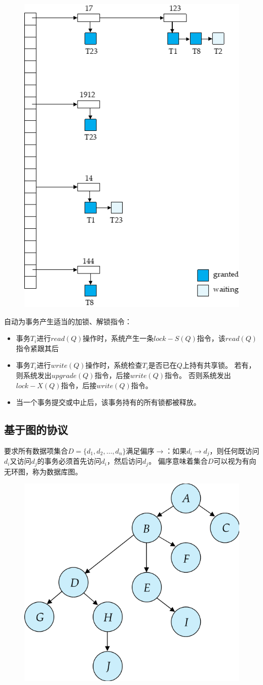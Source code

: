 \begin{figure}[H]
\centering
\includegraphics[width=0.4\linewidth]{fig/lock_table.png}
\end{figure}

自动为事务产生适当的加锁、解锁指令：
\begin{itemize}
	\item 事务$T_i$进行$read(Q)$操作时，系统产生一条$lock-S(Q)$指令，该$read(Q)$指令紧跟其后
	\item 事务$T_i$进行$write(Q)$操作时，系统检查$T_i$是否已在$Q$上持有共享锁。
	若有，则系统发出$upgrade(Q)$指令，后接$write(Q)$指令。
	否则系统发出$lock-X(Q)$指令，后接$write(Q)$指令。
	\item 当一个事务提交或中止后，该事务持有的所有锁都被释放。
\end{itemize}

\subsection{基于图的协议}
要求所有数据项集合$D=\{d_1,d_2,\ldots,d_n\}$满足偏序$\to$：如果$d_i\to d_j$，则任何既访问$d_i$又访问$d_j$的事务必须首先访问$d_i$，然后访问$d_j$。
偏序意味着集合$D$可以视为有向无环图，称为数据库图。
\begin{figure}[H]
\centering
\includegraphics[width=0.4\linewidth]{fig/tree_protocol.png}
\end{figure}

